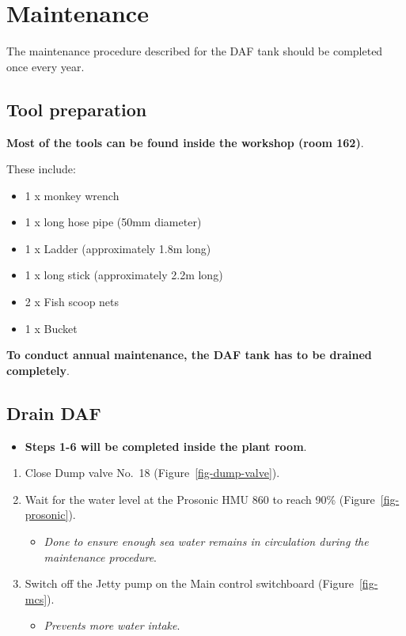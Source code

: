 \documentclass[
  letterpaper,
  DIV=11,
  numbers=noendperiod]{scrreprt}
\providecommand{\tightlist}{%
  \setlength{\itemsep}{0pt}\setlength{\parskip}{0pt}}\usepackage{longtable,booktabs,array}
\begin{document}
\hypertarget{sec-daf-maintain}{%
\section{Maintenance}\label{sec-daf-maintain}}

{The maintenance procedure described for the DAF tank should be
completed once every year}.

\hypertarget{sec-daf-tool}{%
\subsection{Tool preparation}\label{sec-daf-tool}}

\textbf{Most of the tools can be found inside the workshop (room 162)}.

These include:

\begin{itemize}
\tightlist
\item
  1 x monkey wrench
\item
  1 x long hose pipe (50mm diameter)
\item
  1 x Ladder (approximately 1.8m long)
\item
  1 x long stick (approximately 2.2m long)
\item
  2 x Fish scoop nets
\item
  1 x Bucket
\end{itemize}

\textbf{To conduct annual maintenance, the DAF tank has to be drained
completely}.

\hypertarget{drain-daf}{%
\subsection{Drain DAF}\label{drain-daf}}

\begin{itemize}
\tightlist
\item
  \textbf{Steps 1-6 will be completed inside the plant room}.
\end{itemize}

\begin{enumerate}
\def\labelenumi{\arabic{enumi}.}
\tightlist
\item
  Close Dump valve No.~18 (Figure~\ref{fig-dump-valve}).
\item
  Wait for the water level at the Prosonic HMU 860 to reach 90\%
  (Figure~\ref{fig-prosonic}).

  \begin{itemize}
  \tightlist
  \item
    \emph{Done to ensure enough sea water remains in circulation during
    the maintenance procedure}.
  \end{itemize}
\item
  Switch off the Jetty pump on the Main control switchboard
  (Figure~\ref{fig-mcs}).

  \begin{itemize}
  \tightlist
  \item
    \emph{Prevents more water intake}.
  \end{itemize}
\end{enumerate}
\end{document}
